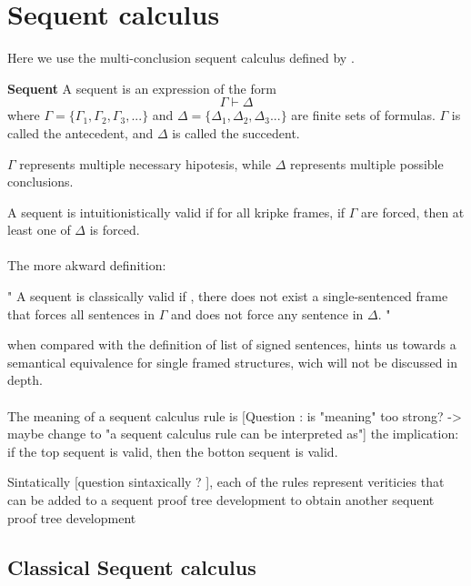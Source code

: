 \documentclass[runningheads]{llncs}
\begin{document}
\section{Sequent calculus}
    Here we use the multi-conclusion sequent calculus defined by \cite{book2}. 
    
\begin {definition}
    \textbf{Sequent} A sequent is an expression of the form 
    \[
    \Gamma \vdash \Delta
    \]
    where $\Gamma = \{\Gamma_1, \Gamma_2, \Gamma_3,...\}$ and $\Delta = \{\Delta_1,\Delta_2,\Delta_3 ...\}$
     are  finite sets of formulas. $\Gamma $ is called the antecedent, and 
    $\Delta$ is called the succedent. 
\end {definition}


$\Gamma $ represents multiple necessary hipotesis, while $\Delta$ represents multiple possible conclusions. 
\begin {definition}
A sequent is intuitionistically valid if for all kripke frames, if $\Gamma$ are forced, then at least one of $\Delta$ is forced.
\end {definition}
\paragraph{}
The more akward definition:


"
A sequent is classically valid if , there does not exist a single-sentenced frame 
that forces all sentences in $\Gamma$ and does not force any sentence in $\Delta$.
"

when compared with the definition of list of signed sentences, hints us towards a semantical equivalence for single framed structures, wich will not be discussed in depth. 

\paragraph{}
The meaning of a sequent calculus rule is [Question : is "meaning" too strong? -> maybe change to "a sequent calculus rule can be interpreted as"] the implication: if the top sequent is 
 valid, then the botton sequent is valid.
 
Sintatically [question sintaxically ? ], each of the rules represent veriticies that can be added to a sequent proof tree development 
to obtain another sequent proof tree development




\subsection {Classical Sequent calculus}
\end{document}
